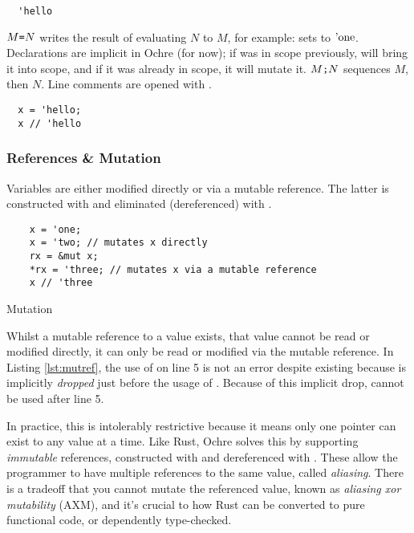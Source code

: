 \documentclass[12pt,twoside]{report}
\begin{document}
\begin{verbatim}
  'hello
\end{verbatim}

$M \text{\texttt{=}} N$ writes the result of evaluating $N$ to $M$, for example:  sets  to $\text{'one}$. Declarations are implicit in Ochre (for now); if  was in scope previously,  will bring it into scope, and if it was already in scope, it will mutate it. $M \text{\texttt{;}} N$ sequences $M$, then $N$. Line comments are opened with \mono{//}.

\begin{verbatim}
  x = 'hello;
  x // 'hello
\end{verbatim}

\subsubsection{References \& Mutation}
Variables are either modified directly or via a mutable reference. The latter is constructed with  and eliminated (dereferenced) with \mono{*}.

\begin{listing}[H]
  \begin{verbatim}
    x = 'one;
    x = 'two; // mutates x directly
    rx = &mut x;
    *rx = 'three; // mutates x via a mutable reference
    x // 'three
  \end{verbatim}
  \caption{Mutation}
  \label{lst:mutref}
\end{listing}

Whilst a mutable reference to a value exists, that value cannot be read or modified directly, it can only be read or modified via the mutable reference. In Listing \ref{lst:mutref}, the use of  on line 5 is not an error despite  existing because is implicitly \textit{dropped} just before the usage of . Because of this implicit drop,  cannot be used after line 5.

In practice, this is intolerably restrictive because it means only one pointer can exist to any value at a time. Like Rust, Ochre solves this by supporting \textit{immutable} references, constructed with \mono{\&} and dereferenced with \mono{*}. These allow the programmer to have multiple references to the same value, called \textit{aliasing}. There is a tradeoff that you cannot mutate the referenced value, known as \textit{aliasing xor mutability} (AXM), and it's crucial to how Rust can be converted to pure functional code, or dependently type-checked.
\end{document}
